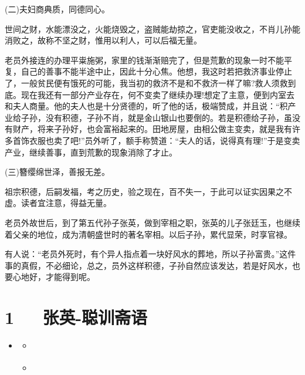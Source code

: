 \documentclass[letterpaper,10pt,english]{sphinxmanual}
\begin{document}
(二)夫妇商典质，同德同心。

世间之财，水能漂没之，火能烧毁之，盗贼能劫掠之，官吏能没收之，不肖儿孙能消败之，故称不坚之财，惟用以利人，可以后福无量。

老员外接连的办理平粜施粥，家里的钱渐渐赔完了，但是荒歉的现象一时不能平复，自己的善事不能半途中止，因此十分心焦。他想，我这时若把救济事业停止了，一般贫民便有饿死的可能，我当初的救济不是和不救济一样了嘛?救人须救到底。现在我还有一部分产业存在，何不变卖了继续办理!想定了主意，便到内室去和夫人商量。他的夫人也是十分贤德的，听了他的话，极端赞成，并且说：“积产业给子孙，没有积德，子孙不肖，就是金山银山也要倒的。若是积德给子孙，虽没有财产，将来子孙好，也会富裕起来的。田地房屋，由相公做主变卖，就是我有许多首饰衣服也卖了吧!”员外听了，额手称赞道：“夫人的话，说得真有理!”于是变卖产业，继续善事，直到荒歉的现象消除了才止。

(三)簪缨绵世泽，善报无差。

祖宗积德，后嗣发福，考之历史，验之现在，百不失一，于此可以证实因果之不虚。读者宜注意，得益无量。

老员外故世后，到了第五代孙子张英，做到宰相之职，张英的儿子张廷玉，也继续着父亲的地位，成为清朝盛世时的著名宰相。以后子孙，累代显荣，时享官禄。

有人说：“老员外死时，有个异人指点着一块好风水的葬地，所以子孙富贵。”这件事的真假，不必细论，总之，员外这样积德，子孙自然应该发达，若是好风水，也要心地好，才能得到呢。


\chapter{1   张英-聪训斋语}
\label{\detokenize{p00_u5176_u5b83/_u5f20_u82f1-_u806a_u8bad_u658b_u8bed:id1}}\label{\detokenize{p00_u5176_u5b83/_u5f20_u82f1-_u806a_u8bad_u658b_u8bed::doc}}
\begin{sphinxShadowBox}
\begin{itemize}
\item {} 
\label{\detokenize{p00_u5176_u5b83/_u5f20_u82f1-_u806a_u8bad_u658b_u8bed:id5}}{\hyperref[\detokenize{p00_u5176_u5b83/_u5f20_u82f1-_u806a_u8bad_u658b_u8bed:id1}]{}}
\begin{itemize}
\item {} 
\label{\detokenize{p00_u5176_u5b83/_u5f20_u82f1-_u806a_u8bad_u658b_u8bed:id6}}{\hyperref[\detokenize{p00_u5176_u5b83/_u5f20_u82f1-_u806a_u8bad_u658b_u8bed:id3}]{}}

\item {} 
\label{\detokenize{p00_u5176_u5b83/_u5f20_u82f1-_u806a_u8bad_u658b_u8bed:id7}}{\hyperref[\detokenize{p00_u5176_u5b83/_u5f20_u82f1-_u806a_u8bad_u658b_u8bed:id4}]{}}

\end{itemize}

\end{itemize}
\end{sphinxShadowBox}
\end{document}
